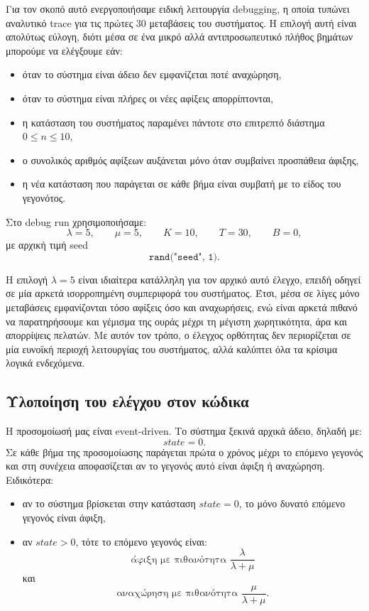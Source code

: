 \documentclass{article}
\begin{document}
Για τον σκοπό αυτό ενεργοποιήσαμε ειδική λειτουργία \foreignlanguage{english}{debugging}, η οποία τυπώνει αναλυτικό \foreignlanguage{english}{trace} για τις πρώτες $30$ μεταβάσεις του συστήματος. Η επιλογή αυτή είναι απολύτως εύλογη, διότι μέσα σε ένα μικρό αλλά αντιπροσωπευτικό πλήθος βημάτων μπορούμε να ελέγξουμε εάν:

\begin{itemize}
    \item όταν το σύστημα είναι άδειο δεν εμφανίζεται ποτέ αναχώρηση,
    \item όταν το σύστημα είναι πλήρες οι νέες αφίξεις απορρίπτονται,
    \item η κατάσταση του συστήματος παραμένει πάντοτε στο επιτρεπτό διάστημα $0 \leq n \leq 10$,
    \item ο συνολικός αριθμός αφίξεων αυξάνεται μόνο όταν συμβαίνει προσπάθεια άφιξης,
    \item η νέα κατάσταση που παράγεται σε κάθε βήμα είναι συμβατή με το είδος του γεγονότος.
\end{itemize}

Στο \foreignlanguage{english}{debug} run χρησιμοποιήσαμε:
\[
\lambda = 5,\qquad \mu = 5,\qquad K = 10,\qquad T = 30,\qquad B = 0,
\]
με αρχική τιμή \foreignlanguage{english}{seed}
\[
\texttt{rand("seed", 1)}.
\]

Η επιλογή $\lambda = 5$ είναι ιδιαίτερα κατάλληλη για τον αρχικό αυτό έλεγχο, επειδή οδηγεί σε μία αρκετά ισορροπημένη συμπεριφορά του συστήματος. Έτσι, μέσα σε λίγες μόνο μεταβάσεις εμφανίζονται τόσο αφίξεις όσο και αναχωρήσεις, ενώ είναι αρκετά πιθανό να παρατηρήσουμε και γέμισμα της ουράς μέχρι τη μέγιστη χωρητικότητα, άρα και απορρίψεις πελατών. Με αυτόν τον τρόπο, ο έλεγχος ορθότητας δεν περιορίζεται σε μία ευνοϊκή περιοχή λειτουργίας του συστήματος, αλλά καλύπτει όλα τα κρίσιμα λογικά ενδεχόμενα.

\subsection{Υλοποίηση του ελέγχου στον κώδικα}

Η προσομοίωσή μας είναι \foreignlanguage{english}{event-driven}. Το σύστημα ξεκινά αρχικά άδειο, δηλαδή με:
\[
state = 0.
\]
Σε κάθε βήμα της προσομοίωσης παράγεται πρώτα ο χρόνος μέχρι το επόμενο γεγονός και στη συνέχεια αποφασίζεται αν το γεγονός αυτό είναι άφιξη ή αναχώρηση. Ειδικότερα:

\begin{itemize}
    \item αν το σύστημα βρίσκεται στην κατάσταση $state = 0$, το μόνο δυνατό επόμενο γεγονός είναι άφιξη,
    \item αν $state > 0$, τότε το επόμενο γεγονός είναι:
    \[
    \text{άφιξη με πιθανότητα } \frac{\lambda}{\lambda+\mu}
    \]
    και
    \[
    \text{αναχώρηση με πιθανότητα } \frac{\mu}{\lambda+\mu}.
    \]
\end{itemize}
\end{document}
